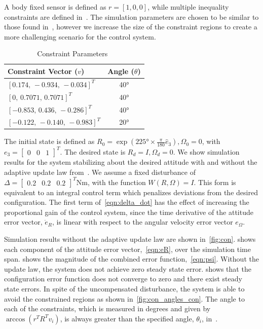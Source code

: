 A body fixed sensor is defined as \(r = [1,0,0]\), while multiple inequality constraints are defined in~.
The simulation parameters are chosen to be similar to those found in~\cite{lee2011b}, however we increase the size of the constraint regions to create a more challenging scenario for the control system.
\vspace{-2.5mm}
\begin{table}[htbp]
\caption{Constraint Parameters~\label{tab:constraints}}
\begin{center}\begin{tabular}{lc}
Constraint Vector (\( v \)) & Angle (\( \theta \)) \\ \hline \hline 
\([0.174,\,-0.934,\, -0.034]^T\) & \ang{40} \\ \hline 
\([0 ,\, 0.7071 ,\, 0.7071]^T\) & \ang{40} \\ \hline 
\([-0.853 ,\, 0.436 ,\, -0.286]^T\) & \ang{40} \\ \hline 
\([-0.122 ,\,-0.140,\, -0.983]^T\) & \ang{20}\end{tabular} 
\end{center}
\end{table}
\vspace{-2.5mm}
The initial state is defined as \(R_0 =  \exp(\ang{225} \times \frac{\pi}{180} \hat{e}_3), \Omega_0 = 0\), with \( e_3 = \begin{bmatrix} 0 & 0 & 1 \end{bmatrix}^T \).
The desired state is \( R_d = I,\Omega_d = 0\).
We show simulation results for the system stabilizing about the desired attitude with and without the adaptive update law from~.
We assume a fixed disturbance of \(\Delta = \begin{bmatrix} 0.2 & 0.2 & 0.2 \end{bmatrix}^T \si{\newton\meter}\), with the function \( W(R,\Omega) = I \).
This form is equivalent to an integral control term which penalizes deviations from the desired configuration.
The first term of~\cref{eqn:delta_dot} has the effect of increasing the proportional gain of the control system, since the time derivative of the attitude error vector, \( \dot{e}_{R} \), is linear with respect to the angular velocity error vector \( e_\Omega\).

Simulation results without the adaptive update law are shown in~\cref{fig:con}.
 shows each component of the attitude error vector,~\cref{eqn:eR}, over the simulation time span.
 shows the  magnitude of the combined error function,~\cref{eqn:psi}.
Without the update law, the system does not achieve zero steady state error. 
 shows that the configuration error function does not converge to zero and there exist steady state errors.
In spite of the uncompensated disturbance, the system is able to avoid the constrained regions as shown in~\cref{fig:con_angles_con}.
The angle to each of the constraints, which is measured in degrees and given by \( \arccos(r^T R^T v_i) \), is always greater than the specified angle, \( \theta_i \), in~.

